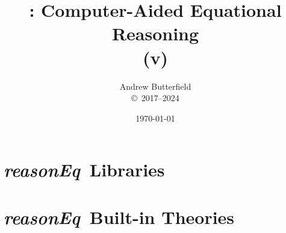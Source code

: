 \documentclass[fleqn,10pt]{report}
\author{
Andrew Butterfield
\\
{\small \copyright\ 2017--2024}
}
\title{
  \reasonEq: Computer-Aided Equational Reasoning
  \\(v\reqVersion)
}
\date{
\today
}
\def\reasonEq{\textit{\textsf{reasonEq}}}
\begin{document}
\maketitle
\setcounter{tocdepth}{1}
\tableofcontents

\part{\reasonEq\ Libraries}

\newpage
\newpage
\newpage
\newpage

% 



\part{\reasonEq\ Built-in Theories}
\end{document}
